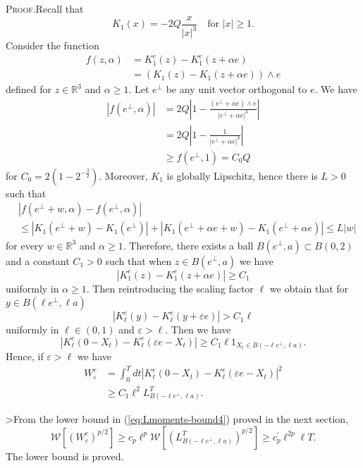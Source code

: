 \documentclass[a4paper,12pt]{article}
\begin{document}
\textsc{Proof.}\hspace{0.3cm}Recall that
\[
K_{1}(x)=-2Q\frac{x}{|x|^{3}}\quad\text{for $|x|\geq$}1.
\]
Consider the function
\begin{align*}
f\left(  z,\alpha\right)   &  =K_{1}^{e}(z)-K_{1}^{e}(z+\alpha e)\\
&  =\left(  K_{1}(z)-K_{1}(z+\alpha e)\right)  \wedge e
\end{align*}
defined for $z\in\mathbb{R}^{3}$ and $\alpha\geq1$. Let $e^{\perp}$ be any
unit vector orthogonal to $e$. We have
\begin{align*}
\left|  f\left(  e^{\perp},\alpha\right)  \right|   &  =2Q\left|
1-\frac{\left(  e^{\perp}+\alpha e\right)  \wedge e}{\left|  e^{\perp}+\alpha
e\right|  ^{3}}\right| \\
&  =2Q\left|  1-\frac{1}{\left|  e^{\perp}+\alpha e\right|  ^{3}}\right| \\
&  \geq f\left(  e^{\perp},1\right)  =C_{0}Q
\end{align*}
for $C_{0}=2\left(  1-2^{-\frac{3}{2}}\right)  $. Moreover, $K_{1}$ is
globally Lipschitz, hence there is $L>0$ such that
\begin{align*}
&  \left|  f\left(  e^{\perp}+w,\alpha\right)  -f\left(  e^{\perp}%
,\alpha\right)  \right| \\
&  \leq\left|  K_{1}(e^{\perp}+w)-K_{1}(e^{\perp})\right|  +\left|
K_{1}(e^{\perp}+\alpha e+w)-K_{1}(e^{\perp}+\alpha e)\right|  \leq L\left|
w\right|
\end{align*}
for every $w\in\mathbb{R}^{3}$ and $\alpha\geq1$. Therefore, there exists a
ball $B(e^{\perp},a)\subset B(0,2)$ and a constant $C_{1}>0$ such that when
$z\in B(e^{\perp},a)$ we have
\[
|K_{1}^{e}(z)-K_{1}^{e}(z+\alpha e)|\geq C_{1}%
\]
uniformly in $\alpha\geq1$. Then reintroducing the scaling factor $\ell$ we
obtain that for $y\in B(\ell e^{\perp},\ell a)$
\[
|K_{\ell}^{e}(y)-K_{\ell}^{e}(y+\varepsilon e)|>C_{1}\ell
\]
uniformly in $\ell\in(0,1)$ and $\varepsilon>\ell$. Then we have
\[
|K_{\ell}^{e}(0-X_{t})-K_{\ell}^{e}(\varepsilon e-X_{t})|\geq C_{1}%
\ell1_{X_{t}\in B(-\ell e^{\perp},\ell a)}.
\]
Hence, if $\varepsilon>\ell$ we have
\begin{align*}
W_{\varepsilon}^{e}  &  =\int_{0}^{T}dt|K_{\ell}^{e}(0-X_{t})-K_{\ell}%
^{e}(\varepsilon e-X_{t})|^{2}\\
&  \geq C_{1}\ell^{2}L_{B(-\ell e^{\perp},\ell a)}^{T}.
\end{align*}

>From the lower bound in (\ref{eq:Lmoments-bound4}) proved in the next
section,
\[
\mathcal{W}\left[  \left(  W_{\varepsilon}^{e}\right)  ^{p/2}\right]  \geq
c_{p}\ell^{p}\mathcal{W}\left[  \left(  L_{B(-\ell e^{\perp},\ell a)}%
^{T}\right)  ^{p/2}\right]  \geq c_{p}^{\prime}\ell^{2p}\ell T.
\]
The lower bound is proved.
\end{document}
